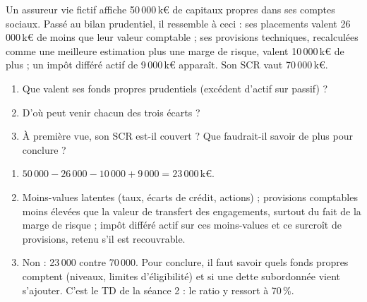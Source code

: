 \documentclass[11pt,a4paper]{article}
\newcommand{\keur}{\,k\euro}
\begin{document}
\begin{exercice}
Un assureur vie fictif affiche 50\,000\keur{} de capitaux propres dans ses comptes sociaux. Passé
au bilan prudentiel, il ressemble à ceci : ses placements valent 26\,000\keur{} de moins que leur
valeur comptable ; ses provisions techniques, recalculées comme une meilleure estimation plus une
marge de risque, valent 10\,000\keur{} de plus ; un impôt différé actif de 9\,000\keur{} apparaît.
Son SCR vaut 70\,000\keur.
\begin{enumerate}[nosep]
  \item Que valent ses fonds propres prudentiels (excédent d'actif sur passif) ?
  \item D'où peut venir chacun des trois écarts ?
  \item À première vue, son SCR est-il couvert ? Que faudrait-il savoir de plus pour conclure ?
\end{enumerate}
\end{exercice}
\begin{corrige}
\begin{enumerate}[nosep]
  \item $50\,000 - 26\,000 - 10\,000 + 9\,000 = 23\,000$\keur.
  \item Moins-values latentes (taux, écarts de crédit, actions) ; provisions comptables moins
        élevées que la valeur de transfert des engagements, surtout du fait de la marge de risque ;
        impôt différé actif sur ces moins-values et ce surcroît de provisions, retenu s'il est
        recouvrable.
  \item Non : 23\,000 contre 70\,000. Pour conclure, il faut savoir quels fonds propres comptent
        (niveaux, limites d'éligibilité) et si une dette subordonnée vient s'ajouter. C'est le TD
        de la séance 2 : le ratio y ressort à 70\,\%.
\end{enumerate}
\end{corrige}
\end{document}
